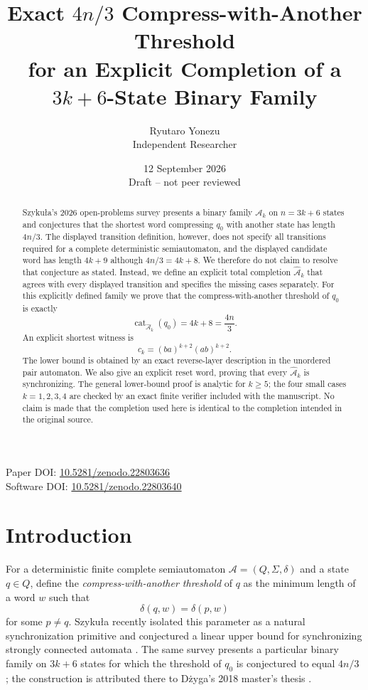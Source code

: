 \documentclass[11pt]{article}
\title{Exact $4n/3$ Compress-with-Another Threshold\\
for an Explicit Completion of a $3k+6$-State Binary Family}
\author{Ryutaro Yonezu\\Independent Researcher}
\date{12 September 2026\\Draft -- not peer reviewed}
\theoremstyle{definition}
\theoremstyle{remark}
\newcommand{\Ahat}{\widehat{\mathcal A}}
\newcommand{\cat}{\operatorname{cat}}
\begin{document}
\maketitle

\begin{center}
\small
Paper DOI: \href{https://doi.org/10.5281/zenodo.22803636}{10.5281/zenodo.22803636}\\
Software DOI: \href{https://doi.org/10.5281/zenodo.22803640}{10.5281/zenodo.22803640}
\end{center}

\begin{abstract}
Szyku\l a's 2026 open-problems survey presents a binary family $\mathcal A_k$ on $n=3k+6$ states and conjectures that the shortest word compressing $q_0$ with another state has length $4n/3$. The displayed transition definition, however, does not specify all transitions required for a complete deterministic semiautomaton, and the displayed candidate word has length $4k+9$ although $4n/3=4k+8$. We therefore do not claim to resolve that conjecture as stated. Instead, we define an explicit total completion $\Ahat_k$ that agrees with every displayed transition and specifies the missing cases separately. For this explicitly defined family we prove that the compress-with-another threshold of $q_0$ is exactly
\[
\cat_{\Ahat_k}(q_0)=4k+8=\frac{4n}{3}.
\]
An explicit shortest witness is
\[
 c_k=(ba)^{k+2}(ab)^{k+2}.
\]
The lower bound is obtained by an exact reverse-layer description in the unordered pair automaton. We also give an explicit reset word, proving that every $\Ahat_k$ is synchronizing. The general lower-bound proof is analytic for $k\ge5$; the four small cases $k=1,2,3,4$ are checked by an exact finite verifier included with the manuscript. No claim is made that the completion used here is identical to the completion intended in the original source.
\end{abstract}

\section{Introduction}
For a deterministic finite complete semiautomaton $\mathcal A=(Q,\Sigma,\delta)$ and a state $q\in Q$, define the \emph{compress-with-another threshold} of $q$ as the minimum length of a word $w$ such that
\[
 \delta(q,w)=\delta(p,w)
\]
for some $p\ne q$. Szyku\l a recently isolated this parameter as a natural synchronization primitive and conjectured a linear upper bound for synchronizing strongly connected automata \cite{Szykula2026}. The same survey presents a particular binary family on $3k+6$ states for which the threshold of $q_0$ is conjectured to equal $4n/3$ \cite[Sec.~2.3, Conj.~8]{Szykula2026}; the construction is attributed there to D\.{z}yga's 2018 master's thesis \cite{Dzyga2018}.
\end{document}

